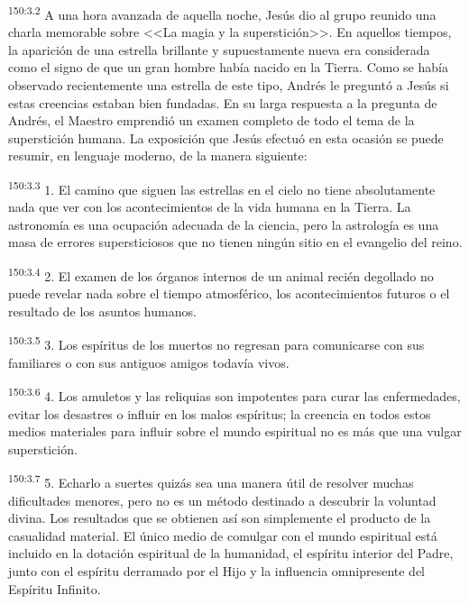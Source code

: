 \par 
\textsuperscript{150:3.2} A una hora avanzada de aquella noche, Jesús dio al grupo reunido una charla memorable sobre <<La magia y la superstición>>. En aquellos tiempos, la aparición de una estrella brillante y supuestamente nueva era considerada como el signo de que un gran hombre había nacido en la Tierra. Como se había observado recientemente una estrella de este tipo, Andrés le preguntó a Jesús si estas creencias estaban bien fundadas. En su larga respuesta a la pregunta de Andrés, el Maestro emprendió un examen completo de todo el tema de la superstición humana. La exposición que Jesús efectuó en esta ocasión se puede resumir, en lenguaje moderno, de la manera siguiente:

\par 
\textsuperscript{150:3.3} 1. El camino que siguen las estrellas en el cielo no tiene absolutamente nada que ver con los acontecimientos de la vida humana en la Tierra. La astronomía es una ocupación adecuada de la ciencia, pero la astrología es una masa de errores supersticiosos que no tienen ningún sitio en el evangelio del reino.

\par 
\textsuperscript{150:3.4} 2. El examen de los órganos internos de un animal recién degollado no puede revelar nada sobre el tiempo atmosférico, los acontecimientos futuros o el resultado de los asuntos humanos.

\par 
\textsuperscript{150:3.5} 3. Los espíritus de los muertos no regresan para comunicarse con sus familiares o con sus antiguos amigos todavía vivos.

\par 
\textsuperscript{150:3.6} 4. Los amuletos y las reliquias son impotentes para curar las enfermedades, evitar los desastres o influir en los malos espíritus; la creencia en todos estos medios materiales para influir sobre el mundo espiritual no es más que una vulgar superstición.

\par 
\textsuperscript{150:3.7} 5. Echarlo a suertes quizás sea una manera útil de resolver muchas dificultades menores, pero no es un método destinado a descubrir la voluntad divina. Los resultados que se obtienen así son simplemente el producto de la casualidad material. El único medio de comulgar con el mundo espiritual está incluido en la dotación espiritual de la humanidad, el espíritu interior del Padre, junto con el espíritu derramado por el Hijo y la influencia omnipresente del Espíritu Infinito.

